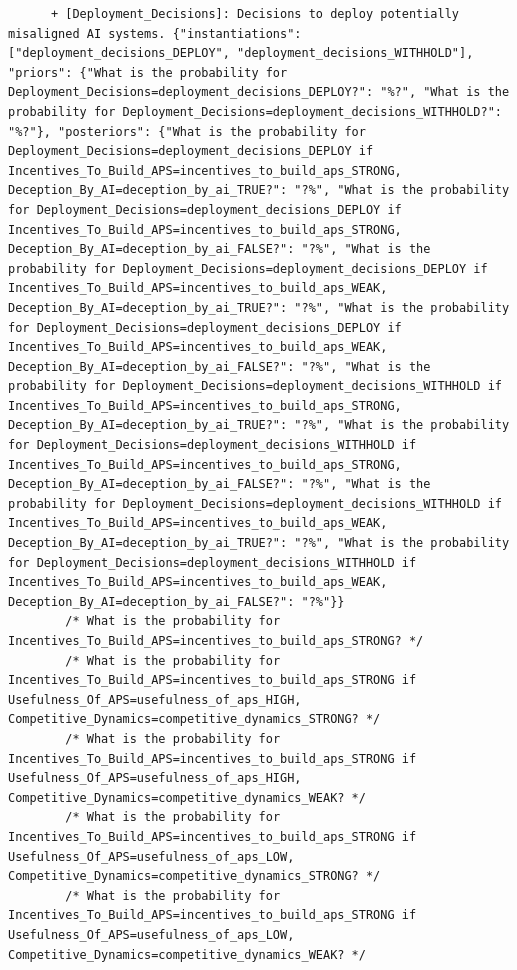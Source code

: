 \documentclass[
  11pt,
  letterpaper,
]{book}
\begin{document}
\begin{landscape}
\begin{verbatim}
      + [Deployment_Decisions]: Decisions to deploy potentially misaligned AI systems. {"instantiations": ["deployment_decisions_DEPLOY", "deployment_decisions_WITHHOLD"], "priors": {"What is the probability for Deployment_Decisions=deployment_decisions_DEPLOY?": "%?", "What is the probability for Deployment_Decisions=deployment_decisions_WITHHOLD?": "%?"}, "posteriors": {"What is the probability for Deployment_Decisions=deployment_decisions_DEPLOY if Incentives_To_Build_APS=incentives_to_build_aps_STRONG, Deception_By_AI=deception_by_ai_TRUE?": "?%", "What is the probability for Deployment_Decisions=deployment_decisions_DEPLOY if Incentives_To_Build_APS=incentives_to_build_aps_STRONG, Deception_By_AI=deception_by_ai_FALSE?": "?%", "What is the probability for Deployment_Decisions=deployment_decisions_DEPLOY if Incentives_To_Build_APS=incentives_to_build_aps_WEAK, Deception_By_AI=deception_by_ai_TRUE?": "?%", "What is the probability for Deployment_Decisions=deployment_decisions_DEPLOY if Incentives_To_Build_APS=incentives_to_build_aps_WEAK, Deception_By_AI=deception_by_ai_FALSE?": "?%", "What is the probability for Deployment_Decisions=deployment_decisions_WITHHOLD if Incentives_To_Build_APS=incentives_to_build_aps_STRONG, Deception_By_AI=deception_by_ai_TRUE?": "?%", "What is the probability for Deployment_Decisions=deployment_decisions_WITHHOLD if Incentives_To_Build_APS=incentives_to_build_aps_STRONG, Deception_By_AI=deception_by_ai_FALSE?": "?%", "What is the probability for Deployment_Decisions=deployment_decisions_WITHHOLD if Incentives_To_Build_APS=incentives_to_build_aps_WEAK, Deception_By_AI=deception_by_ai_TRUE?": "?%", "What is the probability for Deployment_Decisions=deployment_decisions_WITHHOLD if Incentives_To_Build_APS=incentives_to_build_aps_WEAK, Deception_By_AI=deception_by_ai_FALSE?": "?%"}}
        /* What is the probability for Incentives_To_Build_APS=incentives_to_build_aps_STRONG? */
        /* What is the probability for Incentives_To_Build_APS=incentives_to_build_aps_STRONG if Usefulness_Of_APS=usefulness_of_aps_HIGH, Competitive_Dynamics=competitive_dynamics_STRONG? */
        /* What is the probability for Incentives_To_Build_APS=incentives_to_build_aps_STRONG if Usefulness_Of_APS=usefulness_of_aps_HIGH, Competitive_Dynamics=competitive_dynamics_WEAK? */
        /* What is the probability for Incentives_To_Build_APS=incentives_to_build_aps_STRONG if Usefulness_Of_APS=usefulness_of_aps_LOW, Competitive_Dynamics=competitive_dynamics_STRONG? */
        /* What is the probability for Incentives_To_Build_APS=incentives_to_build_aps_STRONG if Usefulness_Of_APS=usefulness_of_aps_LOW, Competitive_Dynamics=competitive_dynamics_WEAK? */

\end{verbatim}
\end{landscape}
\end{document}
